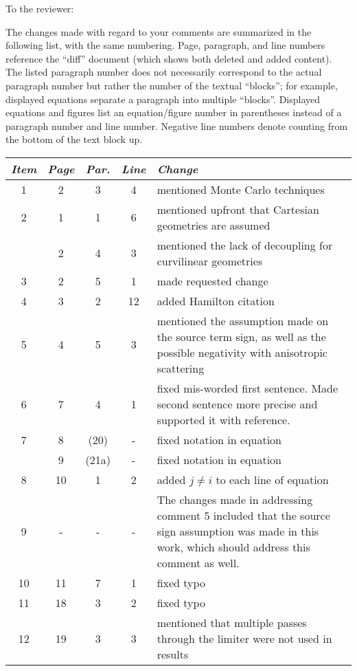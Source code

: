 


To the reviewer:

The changes made with regard to your comments are summarized in the following
list, with the same numbering. Page, paragraph, and line numbers reference
the ``diff'' document (which shows both deleted and added content). The listed
paragraph number does not necessarily correspond to the actual paragraph number
but rather the number of the textual ``blocks''; for example, displayed equations
separate a paragraph into multiple ``blocks''. Displayed equations and figures
list an equation/figure number in parentheses instead of a paragraph number
and line number. Negative line numbers denote counting from the bottom of the
text block up.

\begin{tabular}{c c c c p{3in}}
\emph{Item} & \emph{Page} & \emph{Par.} & \emph{Line} & \emph{Change}\\\hline
1 & 2 & 3 & 4 & mentioned Monte Carlo techniques\\
2 & 1 & 1 & 6 & mentioned upfront that Cartesian geometries are assumed\\
  & 2 & 4 & 3 & mentioned the lack of decoupling for curvilinear geometries\\
3 & 2 & 5 & 1 & made requested change\\
4 & 3 & 2 & 12 & added Hamilton citation\\
5 & 4 & 5 & 3 & mentioned the assumption made on the source term sign, as
  well as the possible negativity with anisotropic scattering\\
6 & 7 & 4 & 1 & fixed mis-worded first sentence. Made second sentence more
  precise and supported it with reference.\\
7 & 8 & (20) & - & fixed notation in equation\\
  & 9 & (21a) & - & fixed notation in equation\\
8 & 10 & 1 & 2 & added $j\ne i$ to each line of equation\\
9 & - & - & - & The changes made in addressing comment 5 included that the source
  sign assumption was made in this work, which should address this comment as well.\\
10 & 11 & 7 & 1 & fixed typo\\
11 & 18 & 3 & 2 & fixed typo\\
12 & 19 & 3 & 3 & mentioned that multiple passes through the limiter were not used in results\\

\end{tabular}

